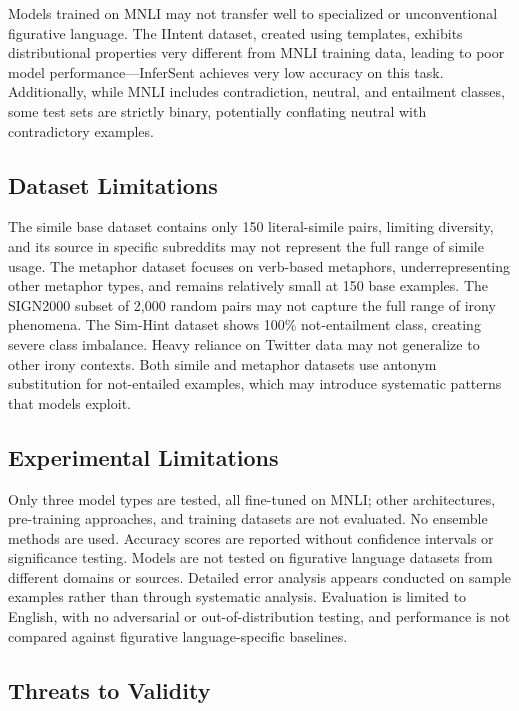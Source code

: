 \documentclass[12pt]{article}
\begin{document}
Models trained on MNLI may not transfer well to specialized or unconventional figurative language. The IIntent dataset, created using templates, exhibits distributional properties very different from MNLI training data, leading to poor model performance---InferSent achieves very low accuracy on this task. Additionally, while MNLI includes contradiction, neutral, and entailment classes, some test sets are strictly binary, potentially conflating neutral with contradictory examples.

\subsection{Dataset Limitations}

The simile base dataset contains only 150 literal-simile pairs, limiting diversity, and its source in specific subreddits may not represent the full range of simile usage. The metaphor dataset focuses on verb-based metaphors, underrepresenting other metaphor types, and remains relatively small at 150 base examples. The SIGN2000 subset of 2,000 random pairs may not capture the full range of irony phenomena. The Sim-Hint dataset shows 100\% not-entailment class, creating severe class imbalance. Heavy reliance on Twitter data may not generalize to other irony contexts. Both simile and metaphor datasets use antonym substitution for not-entailed examples, which may introduce systematic patterns that models exploit.

\subsection{Experimental Limitations}

Only three model types are tested, all fine-tuned on MNLI; other architectures, pre-training approaches, and training datasets are not evaluated. No ensemble methods are used. Accuracy scores are reported without confidence intervals or significance testing. Models are not tested on figurative language datasets from different domains or sources. Detailed error analysis appears conducted on sample examples rather than through systematic analysis. Evaluation is limited to English, with no adversarial or out-of-distribution testing, and performance is not compared against figurative language-specific baselines.

\subsection{Threats to Validity}
\end{document}
